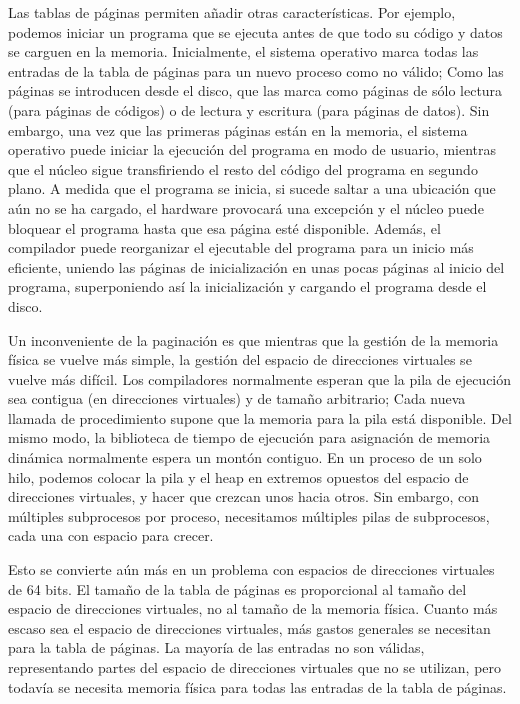 \documentclass[10pt]{book}
\begin{document}
Las tablas de páginas permiten añadir otras características. Por ejemplo, podemos iniciar un programa que se ejecuta antes de que todo su código y datos se carguen en la memoria. Inicialmente, el sistema operativo marca todas las entradas de la tabla de páginas para un nuevo proceso como no válido; Como las páginas se introducen desde el disco, que las marca como páginas de sólo lectura (para páginas de códigos) o de lectura y escritura (para páginas de datos). Sin embargo, una vez que las primeras páginas están en la memoria, el sistema operativo puede iniciar la ejecución del programa en modo de usuario, mientras que el núcleo sigue transfiriendo el resto del código del programa en segundo plano. A medida que el programa se inicia, si sucede saltar a una ubicación que aún no se ha cargado, el hardware provocará una excepción y el núcleo puede bloquear el programa hasta que esa página esté disponible. Además, el compilador puede reorganizar el ejecutable del programa para un inicio más eficiente, uniendo las páginas de inicialización en unas pocas páginas al inicio del programa, superponiendo así la inicialización y cargando el programa desde el disco.

Un inconveniente de la paginación es que mientras que la gestión de la memoria física se vuelve más simple, la gestión del espacio de direcciones virtuales se vuelve más difícil. Los compiladores normalmente esperan que la pila de ejecución sea contigua (en direcciones virtuales) y de tamaño arbitrario; Cada nueva llamada de procedimiento supone que la memoria para la pila está disponible. Del mismo modo, la biblioteca de tiempo de ejecución para asignación de memoria dinámica normalmente espera un montón contiguo. En un proceso de un solo hilo, podemos colocar la pila y el heap en extremos opuestos del espacio de direcciones virtuales, y hacer que crezcan unos hacia otros. Sin embargo, con múltiples subprocesos por proceso, necesitamos múltiples pilas de subprocesos, cada una con espacio para crecer.

Esto se convierte aún más en un problema con espacios de direcciones virtuales de 64 bits. El tamaño de la tabla de páginas es proporcional al tamaño del espacio de direcciones virtuales, no al tamaño de la memoria física. Cuanto más escaso sea el espacio de direcciones virtuales, más gastos generales se necesitan para la tabla de páginas. La mayoría de las entradas no son válidas, representando partes del espacio de direcciones virtuales que no se utilizan, pero todavía se necesita memoria física para todas las entradas de la tabla de páginas.
\end{document}
